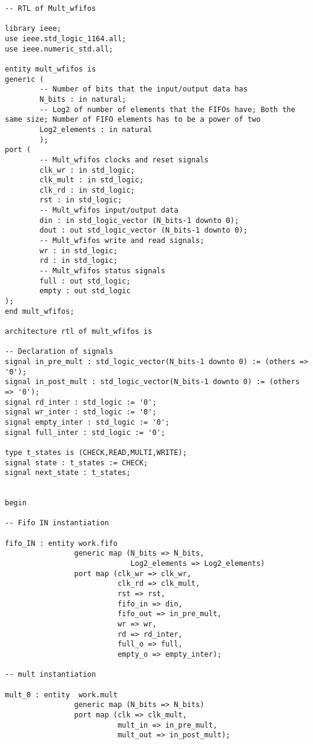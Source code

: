 \begin{code}
\begin{verbatim}
-- RTL of Mult_wfifos

library ieee;
use ieee.std_logic_1164.all;
use ieee.numeric_std.all;

entity mult_wfifos is
generic (
        -- Number of bits that the input/output data has
        N_bits : in natural;
        -- Log2 of number of elements that the FIFOs have; Both the same size; Number of FIFO elements has to be a power of two
        Log2_elements : in natural
        );
port (
        -- Mult_wfifos clocks and reset signals
        clk_wr : in std_logic;
        clk_mult : in std_logic;
        clk_rd : in std_logic;
        rst : in std_logic;
        -- Mult_wfifos input/output data
        din : in std_logic_vector (N_bits-1 downto 0);
        dout : out std_logic_vector (N_bits-1 downto 0);
        -- Mult_wfifos write and read signals;
        wr : in std_logic;
        rd : in std_logic;
        -- Mult_wfifos status signals
        full : out std_logic;
        empty : out std_logic
);
end mult_wfifos;

architecture rtl of mult_wfifos is

-- Declaration of signals
signal in_pre_mult : std_logic_vector(N_bits-1 downto 0) := (others => '0');
signal in_post_mult : std_logic_vector(N_bits-1 downto 0) := (others => '0');
signal rd_inter : std_logic := '0';
signal wr_inter : std_logic := '0';
signal empty_inter : std_logic := '0';
signal full_inter : std_logic := '0';

type t_states is (CHECK,READ,MULTI,WRITE);
signal state : t_states := CHECK;
signal next_state : t_states;


begin

-- Fifo IN instantiation

fifo_IN : entity work.fifo
                generic map (N_bits => N_bits,
                             Log2_elements => Log2_elements)
                port map (clk_wr => clk_wr,
                          clk_rd => clk_mult,
                          rst => rst,
                          fifo_in => din,
                          fifo_out => in_pre_mult,
                          wr => wr,
                          rd => rd_inter,
                          full_o => full,
                          empty_o => empty_inter);

-- mult instantiation

mult_0 : entity  work.mult
                generic map (N_bits => N_bits)
                port map (clk => clk_mult,
                          mult_in => in_pre_mult,
                          mult_out => in_post_mult);


\end{verbatim}
\end{code}
